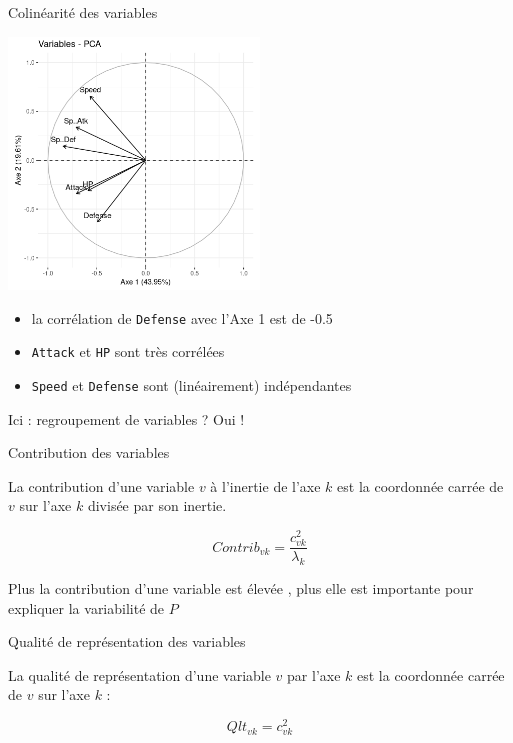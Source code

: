 \documentclass{beamer}
\begin{document}
\begin{frame}{Colinéarité des variables}

\begin{center}
\includegraphics[width=0.5\textwidth,keepaspectratio]{img/cercle_trigo_ACP_var.png}
\end{center}


\begin{itemize}
\item la corrélation de \texttt{Defense} avec l'Axe 1 est de -0.5
\item \texttt{Attack} et \texttt{HP} sont très corrélées
\item \texttt{Speed} et \texttt{Defense} sont (linéairement) indépendantes
\end{itemize}



Ici : regroupement de variables ? Oui ! 


\end{frame}




\begin{frame}{Contribution des variables}

La \alert{contribution} d'une  variable $v$ à l'inertie de l'axe $k$  est la coordonnée carrée  de $v$ sur l'axe $k$ divisée par son inertie.

$$ Contrib_{vk} =\frac{c_{vk}^2}{\lambda_k} $$ 


Plus la contribution d'une variable est élevée , plus elle est importante pour expliquer la variabilité de $P$


\end{frame}


\begin{frame}{Qualité de représentation des variables}

La \alert{qualité de représentation} d'une  variable $v$ par l'axe $k$  est la coordonnée carrée  de $v$ sur l'axe $k$ :

$$Qlt_{vk} = c_{vk}^2$$ 

\end{frame}
\end{document}
